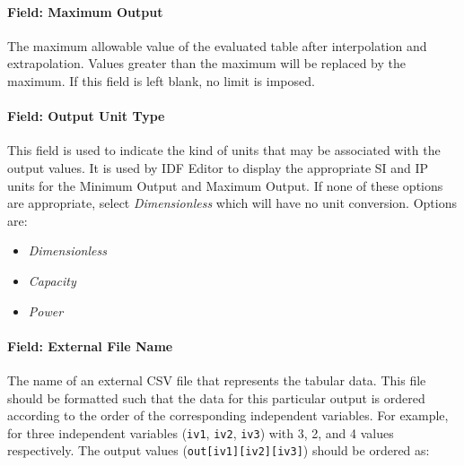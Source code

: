 \paragraph{Field: Maximum Output}\label{field-maximum-output}

The maximum allowable value of the evaluated table after interpolation
and extrapolation. Values greater than the maximum will be replaced by
the maximum. If this field is left blank, no limit is imposed.

\paragraph{Field: Output Unit Type}\label{field-output-unit-type}

This field is used to indicate the kind of units that may be associated
with the output values. It is used by IDF Editor to display the
appropriate SI and IP units for the Minimum Output and Maximum Output.
If none of these options are appropriate, select \emph{Dimensionless}
which will have no unit conversion. Options are:

\begin{itemize}
  \tightlist
  \item
  \emph{Dimensionless}
  \item
  \emph{Capacity}
  \item
  \emph{Power}
\end{itemize}

\paragraph{Field: External File
Name}\label{field-external-file-name}

The name of an external CSV file that represents the tabular data. This
file should be formatted such that the data for this particular output
is ordered according to the order of the corresponding independent
variables. For example, for three independent variables (\texttt{iv1},
\texttt{iv2}, \texttt{iv3}) with 3, 2, and 4 values respectively. The
output values (\texttt{out{[}iv1{]}{[}iv2{]}{[}iv3{]}}) should be
ordered as:

